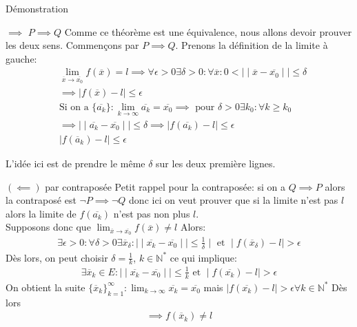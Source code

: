  \begin{parag}{Démonstration}
     \begin{subparag}{ $ \implies$ $P \implies Q$}
         Comme ce théorème est une équivalence, nous allons devoir prouver les deux sens. Commençons par $P \implies Q$. Prenons la définition de la limite à gauche:
         \begin{align*}
             &\lim_{ \overline{x} \to \overline{x_0}} f( \overline{x})= l \implies \forall \epsilon > 0 \exists \delta > 0: \forall \overline{x}: 0 < \mid \mid \overline{x} - \overline{x_0} \mid \mid \leq \delta\\
             &\implies \mid f( \overline{x}) - l \mid \leq \epsilon \\
             &\text{Si on a } \{ \overline{a_k}\}: \lim_{k \to \infty} \overline{a_k} = \overline{x_0} \implies \text{  pour } \delta > 0 \exists k_0 : \forall k \geq k_0 \\
             &\implies \mid \mid \overline{a_k} - \overline{x_0} \mid \mid \leq \delta \implies \mid f( \overline{a_k}) - l \mid \leq \epsilon \\
             &\mid  f( \overline{a}_k) - l \mid \leq \epsilon
         \end{align*}
         \begin{framedremark}
             L'idée ici est de prendre le même $ \delta$ sur les deux première lignes.
         \end{framedremark}
         
     \end{subparag}
     \begin{subparag}{$(\impliedby)$ par contraposée}
         Petit rappel pour la contraposée: si on a $ Q \implies P$ alors la contraposé est $ \neg P \implies \neg Q$ donc ici on veut prouver que si la limite n'est pas $l$ alors la limite de $f( \overline{a_k})$ n'est pas non plus $l$.\\
         Supposons donc que $\lim_{ \overline{x} \to \overline{x_0}}f( \overline{x}) \neq l $ Alors:
             \begin{align*}
                 \exists \epsilon > 0: \forall \delta > 0 \exists \overline{x}_\delta: \mid \mid \overline{x_k} - \overline{x_0} \mid \mid \leq \frac{1}{ \delta} \mid \text{ et } \mid f( \overline{x}_\delta) - l \mid > \epsilon
             \end{align*}
             Dès lors, on peut choisir $ \delta = \frac{1}{k}$, $k \in \mathbb{N}^*$  ce qui implique:
             \begin{align*}
                 \exists \overline{x}_k \in E : \mid \mid  \overline{x_k} - \overline{x_0} \mid \mid \leq \frac{1}{k} \text{ et } \mid f( \overline{x_k}) - l \mid > \epsilon
             \end{align*}
             On obtient la suite $\{ \overline{x}_k\}_{k=1}^\infty: \lim_{k \to \infty} \overline{x_k} = \overline{x_0}$ mais $ \mid f( \overline{x_k}) - l \mid > \epsilon \forall k \in \mathbb{N}^*$ Dès lors
             \begin{align*}
                 \implies f( \overline{x}_k) \neq l
             \end{align*}
     \end{subparag}


\end{parag}
